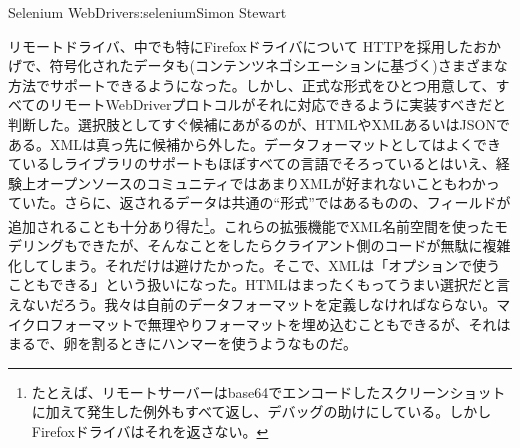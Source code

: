 \begin{aosachapter}{Selenium WebDriver}{s:selenium}{Simon Stewart}
\begin{aosasect1}{リモートドライバ、中でも特にFirefoxドライバについて}
HTTPを採用したおかげで、符号化されたデータも(コンテンツネゴシエーションに基づく)さまざまな方法でサポートできるようになった。しかし、正式な形式をひとつ用意して、すべてのリモートWebDriverプロトコルがそれに対応できるように実装すべきだと判断した。選択肢としてすぐ候補にあがるのが、HTMLやXMLあるいはJSONである。XMLは真っ先に候補から外した。データフォーマットとしてはよくできているしライブラリのサポートもほぼすべての言語でそろっているとはいえ、経験上オープンソースのコミュニティではあまりXMLが好まれないこともわかっていた。さらに、返されるデータは共通の``形式''ではあるものの、フィールドが追加されることも十分あり得た\footnote{たとえば、リモートサーバーはbase64でエンコードしたスクリーンショットに加えて発生した例外もすべて返し、デバッグの助けにしている。しかしFirefoxドライバはそれを返さない。}。これらの拡張機能でXML名前空間を使ったモデリングもできたが、そんなことをしたらクライアント側のコードが無駄に複雑化してしまう。それだけは避けたかった。そこで、XMLは「オプションで使うこともできる」という扱いになった。HTMLはまったくもってうまい選択だと言えないだろう。我々は自前のデータフォーマットを定義しなければならない。マイクロフォーマットで無理やりフォーマットを埋め込むこともできるが、それはまるで、卵を割るときにハンマーを使うようなものだ。


\end{aosasect1}
\end{aosachapter}
